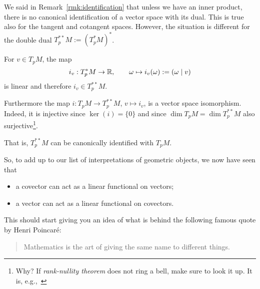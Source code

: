 \begin{remark}\label{rmk:double_dual}
	We said in Remark~\ref{rmk:identification} that unless we have an inner product, there is no canonical identification of a vector space with its dual.
	This is true also for the tangent and cotangent spaces.
	However, the situation is different for the double dual $T^{**}_pM := (T^*_pM)^*$.

	For $v\in T_p M$, the map
	\begin{equation}
		i_v: T_p^*M\to \mathbb{R}, \qquad
		\omega \mapsto i_v(\omega) := (\omega\mid v)
	\end{equation}
	is linear and therefore $i_v\in T^{**}_pM$.

	Furthermore the map $i : T_pM \to T_p^{**}M$, $v\mapsto i_v$, is a vector space isomorphism. Indeed, it is injective since $\ker(i) = \{0\}$ and since $\dim T_p M = \dim T^{**}_p M$ also surjective\footnote{Why? If \emph{rank-nullity theorem} does not ring a bell, make sure to look it up. It is, e.g.,~\cite[Corollary B.21]{book:lee}}.

	That is, $T^{**}_pM$ can be canonically identified with $T_p M$.

	So, to add up to our list of interpretations of geometric objects, we now have seen that
	\begin{itemize}
		\item a covector can act as a linear functional on vectors;
		\item a vector can act as a linear functional on covectors.
	\end{itemize}
\end{remark}

This should start giving you an idea of what is behind the following famous quote by Henri Poincar\'e:
\begin{quote}
	Mathematics is the art of giving the same name to different things.
\end{quote}


